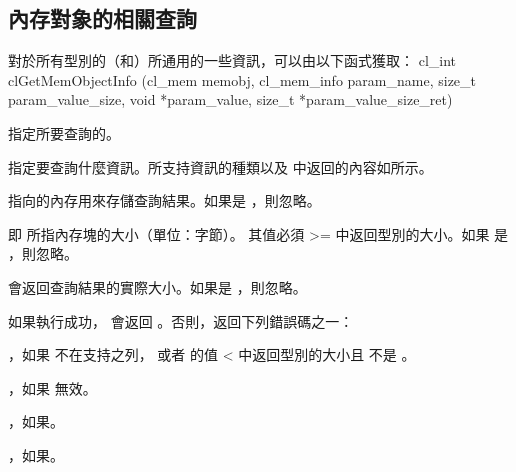 \subsection{內存對象的相關查詢}

對於所有型別的（和）所通用的一些資訊，可以由以下函式獲取：
\startCLFUNC
cl_int clGetMemObjectInfo (cl_mem memobj,
			cl_mem_info param_name,
			size_t param_value_size,
			void *param_value,
			size_t *param_value_size_ret)
\stopCLFUNC

 指定所要查詢的。

 指定要查詢什麼資訊。所支持資訊的種類以及  中返回的內容如所示。

 指向的內存用來存儲查詢結果。如果是 ，則忽略。

 即  所指內存塊的大小（單位：字節）。
其值必須 >= 中返回型別的大小。如果  是 ，則忽略。

 會返回查詢結果的實際大小。如果是 ，則忽略。

如果執行成功， 會返回 。否則，返回下列錯誤碼之一：
\startigBase
\item {}，如果  不在支持之列，
  或者  的值 < 中返回型別的大小且  不是 。
\item {}，如果  無效。
\item {}，如果\scdevfailres。
\item {}，如果\schostfailres。
\stopigBase

{}

